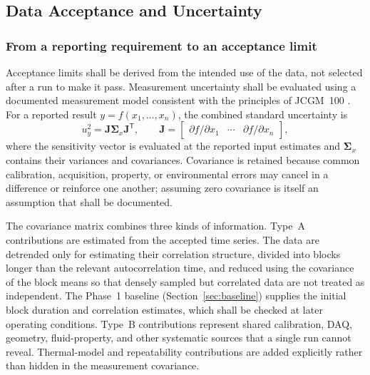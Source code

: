 \documentclass[11pt]{article}
\begin{document}
\subsection{Data Acceptance and Uncertainty}
\label{sec:uncertainty}

\subsubsection{From a reporting requirement to an acceptance limit}

Acceptance limits shall be derived from the intended use of the data, not selected after a run to make it pass. Measurement uncertainty shall be evaluated using a documented measurement model consistent with the principles of JCGM~100 \cite{jcgm100}. For a reported result $y=f(x_1,\ldots,x_n)$, the combined standard uncertainty is
\begin{equation}
    u_y^2
    =
    \mathbf J\boldsymbol\Sigma_x\mathbf J^{\mathsf T},
    \qquad
    \mathbf J
    =
    \begin{bmatrix}
        \partial f/\partial x_1 & \cdots & \partial f/\partial x_n
    \end{bmatrix},
    \label{eq:propagation_matrix}
\end{equation}
where the sensitivity vector is evaluated at the reported input estimates and $\boldsymbol\Sigma_x$ contains their variances and covariances. Covariance is retained because common calibration, acquisition, property, or environmental errors may cancel in a difference or reinforce one another; assuming zero covariance is itself an assumption that shall be documented.

The covariance matrix combines three kinds of information. Type~A contributions are estimated from the accepted time series. The data are detrended only for estimating their correlation structure, divided into blocks longer than the relevant autocorrelation time, and reduced using the covariance of the block means so that densely sampled but correlated data are not treated as independent. The Phase~1 baseline (Section~\ref{sec:baseline}) supplies the initial block duration and correlation estimates, which shall be checked at later operating conditions. Type~B contributions represent shared calibration, DAQ, geometry, fluid-property, and other systematic sources that a single run cannot reveal. Thermal-model and repeatability contributions are added explicitly rather than hidden in the measurement covariance.
\end{document}
